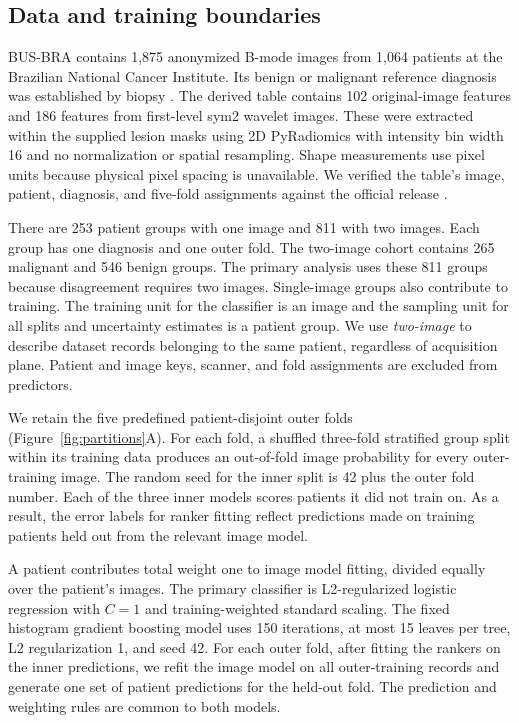 \documentclass[11pt]{article}
\begin{document}
\subsection{Data and training boundaries}
BUS-BRA contains 1,875 anonymized B-mode images from 1,064 patients at the Brazilian National Cancer Institute. Its benign or malignant reference diagnosis was established by biopsy \cite{busbra}. The derived table contains 102 original-image features and 186 features from first-level sym2 wavelet images. These were extracted within the supplied lesion masks using 2D PyRadiomics with intensity bin width 16 and no normalization or spatial resampling. Shape measurements use pixel units because physical pixel spacing is unavailable. We verified the table's image, patient, diagnosis, and five-fold assignments against the official release \cite{zenodo}.

There are 253 patient groups with one image and 811 with two images. Each group has one diagnosis and one outer fold. The two-image cohort contains 265 malignant and 546 benign groups. The primary analysis uses these 811 groups because disagreement requires two images. Single-image groups also contribute to training. The training unit for the classifier is an image and the sampling unit for all splits and uncertainty estimates is a patient group. We use \emph{two-image} to describe dataset records belonging to the same patient, regardless of acquisition plane. Patient and image keys, scanner, and fold assignments are excluded from predictors.

We retain the five predefined patient-disjoint outer folds (Figure~\ref{fig:partitions}A). For each fold, a shuffled three-fold stratified group split within its training data produces an out-of-fold image probability for every outer-training image. The random seed for the inner split is 42 plus the outer fold number. Each of the three inner models scores patients it did not train on. As a result, the error labels for ranker fitting reflect predictions made on training patients held out from the relevant image model.

A patient contributes total weight one to image model fitting, divided equally over the patient's images. The primary classifier is L2-regularized logistic regression with $C=1$ and training-weighted standard scaling. The fixed histogram gradient boosting model uses 150 iterations, at most 15 leaves per tree, L2 regularization 1, and seed 42. For each outer fold, after fitting the rankers on the inner predictions, we refit the image model on all outer-training records and generate one set of patient predictions for the held-out fold. The prediction and weighting rules are common to both models.
\end{document}
